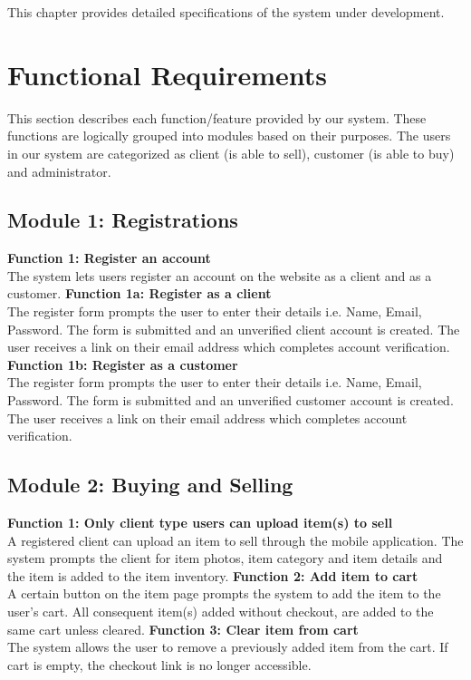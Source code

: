 This chapter provides detailed specifications of the system under development.

\section{Functional Requirements}

This section describes each function/feature provided by our system. These functions are logically grouped into modules based on their purposes. The users in our system are categorized as client (is able to sell), customer (is able to buy) and administrator.
\subsection*{Module 1: Registrations}
\begin{outline}
    \1 \textbf{Function 1: Register an account} \\
    The system lets users register an account on the website as a client and as a customer.
        \2 \textbf{Function 1a: Register as a client} \\
        The register form prompts the user to enter their details i.e. Name, Email, Password. The form is submitted and an unverified client account is created. The user receives a link on their email address which completes account verification.
        \2 \textbf{Function 1b: Register as a customer} \\
        The register form prompts the user to enter their details i.e. Name, Email, Password. The form is submitted and an unverified customer account is created. The user receives a link on their email address which completes account verification.
\end{outline}
\subsection*{Module 2: Buying and Selling}
\begin{outline}
    \1 \textbf{Function 1: Only client type users can upload item(s) to sell} \\
    A registered client can upload an item to sell through the mobile application. The system prompts the client for item photos, item category and item details and the item is added to the item inventory.
    \1 \textbf{Function 2: Add item to cart} \\
    A certain button on the item page prompts the system to add the item to the user's cart. All consequent item(s) added without checkout, are added to the same cart unless cleared.
    \1 \textbf{Function 3: Clear item from cart} \\
    The system allows the user to remove a previously added item from the cart. If cart is empty, the checkout link is no longer accessible.
\end{outline}
